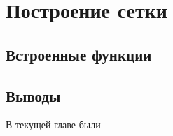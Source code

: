 \chapter{Построение сетки} \label{ch2}

\section{Встроенные функции} \label{ch1:sec1}


\section{Выводы} \label{ch1:conclusion}

В текущей главе были 



